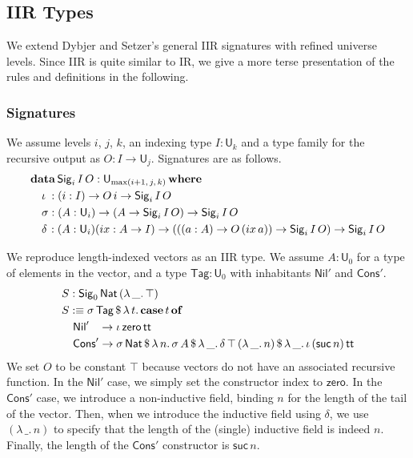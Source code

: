 \documentclass[acmsmall,screen,review,anonymous]{acmart}
\newcommand{\msf}[1]{{\mathsf{#1}}}
\newcommand{\mbf}[1]{{\mathbf{#1}}}
\newcommand{\data}{\mbf{data}}
\newcommand{\U}{\msf{U}}
\newcommand{\where}{\mbf{where}}
\newcommand{\Nat}{\msf{Nat}}
\newcommand{\zero}{\msf{zero}}
\newcommand{\suc}{\msf{suc}}
\newcommand{\Nil}{\msf{Nil}}
\newcommand{\Cons}{\msf{Cons}}
\newcommand{\Sig}{\msf{Sig}}
\newcommand{\Tag}{\msf{Tag}}
\newcommand{\case}{\mbf{case}}
\newcommand{\of}{\mbf{of}}
\newcommand{\ttt}{\msf{tt}}
\newcommand{\ix}{{ix}}
\begin{document}
\subsection{IIR Types}\label{sec:iir}

We extend Dybjer and Setzer's general IIR signatures \cite{TODO} with refined universe levels. Since
IIR is quite similar to IR, we give a more terse presentation of the rules and definitions in the
following.

\subsubsection{Signatures}\label{sec:iir-signatures} We assume levels $i$, $j$, $k$, an indexing type $I : \U_k$ and a type family
for the recursive output as $O : I \to \U_j$. Signatures are as follows.
\begin{alignat*}{4}
  &\data\, \Sig_i\,I\,O : \U_{\max(i+1,\,j,\,k)}\,\where\\
  &\quad \iota\hspace{0.25em}  : (i : I) \to O\,i \to \Sig_i\,I\,O \\
  &\quad \sigma                : (A : \U_i) \to (A \to \Sig_i\,I\,O) \to \Sig_i\,I\,O \\
  &\quad \delta\hspace{0.1em}  : (A : \U_i)(\ix : A \to I) \to (((a : A) \to O\,(\ix\,a)) \to \Sig_i\,I\,O) \to \Sig_i\,I\,O
\end{alignat*}

\begin{example} We reproduce length-indexed vectors as an IIR type. We assume $A : \U_0$ for a type of elements in the vector,
and a type $\Tag : \U_0$ with inhabitants $\Nil'$ and $\Cons'$.
\begin{alignat*}{4}
  & S : \Sig_0\,\Nat\,(\lambda\,\_.\,\top)\\
  & S :\equiv \sigma\,\Tag\,\$\,\lambda\,t.\,\case\,t\,\of \\
  & \quad \Nil'\hspace{0.85em} \to \iota\,\zero\,\ttt \\
  & \quad \Cons'\to \sigma\,\Nat\,\$\,\lambda\,n.\,\sigma\,A\,\$\,\lambda\,\_.\,\delta\,\top\,(\lambda\,\_.\,n)\,\$\,\lambda\,\_.\,\iota\,(\suc\,n)\,\ttt
\end{alignat*}
We set $O$ to be constant $\top$ because vectors do not have an associated recursive function. In
the $\Nil'$ case, we simply set the constructor index to $\zero$. In the $\Cons'$ case, we introduce
a non-inductive field, binding $n$ for the length of the tail of the vector. Then, when we introduce
the inductive field using $\delta$, we use $(\lambda\,\_.\,n)$ to specify that the length of the
(single) inductive field is indeed $n$. Finally, the length of the $\Cons'$ constructor is $\suc\,n$.
\end{example}
\end{document}
